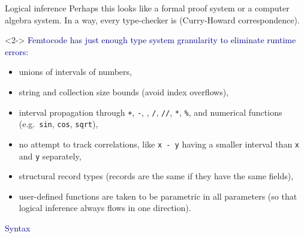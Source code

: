 \documentclass{beamer}
\begin{document}
\begin{frame}{Logical inference}
\vspace{0.25 cm}
Perhaps this looks like a formal proof system or a computer algebra system. In a way, every type-checker is (Curry-Howard correspondence).

\vspace{0.25 cm}
\begin{uncoverenv}<2->
\textcolor{darkblue}{Femtocode has just enough type system granularity to eliminate runtime errors:}
\begin{itemize}
\item unions of intervals of numbers,
\item string and collection size bounds (avoid index overflows),
\item interval propagation through {\tt +}, {\tt -}, {\tt *}, {\tt /}, {\tt //}, {\tt **}, {\tt \%}, and numerical functions (e.g.\ {\tt sin}, {\tt cos}, {\tt sqrt}),
\item no attempt to track correlations, like {\tt x - y} having a smaller interval than {\tt x} and {\tt y} separately,
\item structural record types (records are the same if they have the same fields),
\item user-defined functions are taken to be parametric in all parameters (so that logical inference always flows in one direction).
\end{itemize}
\end{uncoverenv}
\end{frame}

\begin{frame}{}
\begin{center}
\textcolor{darkblue}{\huge Syntax}
\end{center}
\end{frame}
\end{document}
